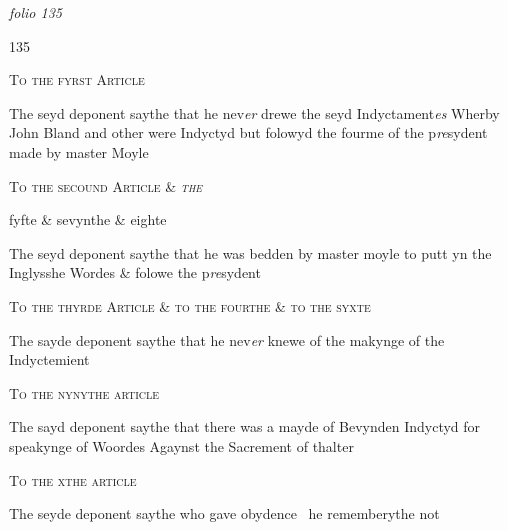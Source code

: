 \documentclass[12pt, a4paper]{book}
\begin{document}
\textit{folio 135}



\begin{flushright}{\color{Mahogany}135}\end{flushright}
 
 	
				\begin{center}  {\scshape To the fyrst Article}  \end{center}
			
 	
		\ifthenelse{\isodd{\thepage}}
		{\reversemarginpar}
		{\normalmarginpar}
		The seyd deponent saythe that he nev\textit{er} drewe the seyd Indyctament\textit{es} Wherby John Bland and other were Indyctyd but folowyd the fourme of the p\textit{re}sydent made by master Moyle
            		
				\begin{center}  {\scshape To the secound Article \& 
                  \textit{the}
			
               fyfte \& sevynthe \& eighte}  \end{center}
			
            			
		\ifthenelse{\isodd{\thepage}}
		{\reversemarginpar}
		{\normalmarginpar}
		The seyd deponent saythe that he was bedden by master moyle to putt yn the Inglysshe Wordes \& folowe the p\textit{re}sydent
            		
				\begin{center}  {\scshape To the thyrde Article \& to the fourthe \& to the syxte }  \end{center}
			
            		
		\ifthenelse{\isodd{\thepage}}
		{\reversemarginpar}
		{\normalmarginpar}
		The sayde deponent saythe that he nev\textit{er} knewe of the makynge of the Indyctemient
            		
				\begin{center}  {\scshape To the nynythe article}  \end{center}
			
            		
		\ifthenelse{\isodd{\thepage}}
		{\reversemarginpar}
		{\normalmarginpar}
		The sayd deponent saythe that there was a mayde of Bevynden Indyctyd for speakynge of Woordes Agaynst the Sacrement of thalter
            		
				\begin{center}  {\scshape To the xthe article}  \end{center}
			
            		
		\ifthenelse{\isodd{\thepage}}
		{\reversemarginpar}
		{\normalmarginpar}
		The seyde deponent saythe who gave obydence  he rememberythe  not
            		
\end{document}
